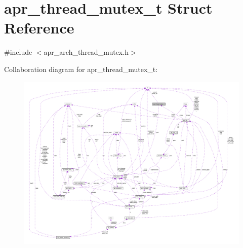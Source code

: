 \hypertarget{structapr__thread__mutex__t}{}\section{apr\+\_\+thread\+\_\+mutex\+\_\+t Struct Reference}
\label{structapr__thread__mutex__t}


{\ttfamily \#include $<$apr\+\_\+arch\+\_\+thread\+\_\+mutex.\+h$>$}



Collaboration diagram for apr\+\_\+thread\+\_\+mutex\+\_\+t\+:
\nopagebreak
\begin{figure}[H]
\begin{center}
\leavevmode
\includegraphics[width=350pt]{structapr__thread__mutex__t__coll__graph}
\end{center}
\end{figure}
